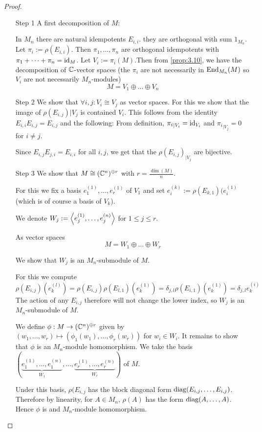 \documentclass[twoside = false,	%
		headsepline,		%
		parskip = true,
		]{scrbook}						%
\begin{document}
    \begin{proof}
        \begin{enumerate}
            \item [Step 1] A first decomposition of $M$:

            In $M_n$ there are natural idempotents $E_{i,i}$. they are orthogonal with sum $1_{M_n}$. Let $\pi_i:= \rho(E_{i,i})$. Then $\pi_1, \dots, \pi_n$ are orthogonal idempotents with $\pi_1 + \dots + \pi_n = \mathrm{id}_M$. Let $V_i := \pi_i(M)$.Then from \ref{prop:3.10}, we have the decomposition of $\mathbb C$-vector spaces (the $\pi_i$ are not necessarily in $\mathrm{End}_{M_n}(M)$ so $V_i$ are not necessarily $M_n$-modules)
            $$M=V_1 \oplus \dots \oplus V_n$$

            \item[Step 2] We show that $\forall i,j: V_i\cong V_j$ as vector spaces. For this we show that the image of $\rho(E_{i,j})|{V_j}$ is contained $V_i$. This follows from the identity $E_{i,i}E_{i,j}=E_{i,j}$ and the following: 
            From definition, ${\pi_i}_{|V_i}=\mathrm{id}_{V_i}$ and ${\pi_i}_{|V_j}=0$ for $i\neq j$.

            Since $E_{i,j} E_{j,i} = E_{i,i}$ for all $i,j$, we get that the $\rho(E_{i,j})_{|V_j}$ are bijective.

            \item[Step 3] We show that $M\cong (\mathbb C^n)^{\oplus r}$ with $r=\frac{\dim(M)}n$.

            For this we fix a basis $e_1^{(1)}, \dots, e_r^{(1)}$ of $V_1$ and set $e_i^{(k)}:= \rho(E_{k,1})(e_i^{(1)}$ (which is of course a basis of $V_k$).

            We denote $W_j:= \left\langle e_j^{(1)}, \dots, e_j^{(n)}\right\rangle$ for $1\leq j \leq r$. 

            As vector spaces $$M = W_1 \oplus \dots \oplus W_r$$

            We show that $W_j$ is an $M_n$-submodule of $M$.

            For this we compute $$\rho(E_{i,j})(e_k^{(l)}) = \rho(E_{i,j})\rho(E_{l,1})(e_k^{(1)}) = \delta_{j,l} \rho(E_{i,1})(e_k^{(1)}) = \delta_{j,l} e_k^{(i)}$$
            The action of any $E_{i,j}$ therefore will not change the lower index, so $W_j$ is an $M_n$-submodule of $M$.

            We define $\phi:M\to(\mathbb C^n)^{\oplus r}$ given by $(w_1, \dots, w_r) \mapsto (\phi_1(w_1), \dots, \phi_r(w_r))$ for $w_i\in W_i$. It remains to show that $\phi$ is an $M_n$-module homomorphism.
            We take the basis $(\underbrace{e_1^{(1)}, \dots, e_1^{(n)}}_{W_1}, \dots, \underbrace{e_r^{(1)}, \dots, e_r^{(n)}}_{W_r})$ of $M$.

            Under this basis, $\rho(E_{i,j}$ has the block diagonal form $\mathrm{diag}(E_{i,j}, \dots, E_{i,j})$. Therefore by linearity, for $A\in M_n$, $\rho(A)$ has the form $\mathrm{diag}(A,\dots, A)$. Hence $\phi$ is and $M_n$-module homomorphism.
        \end{enumerate}
    \end{proof}
    
\end{document}
